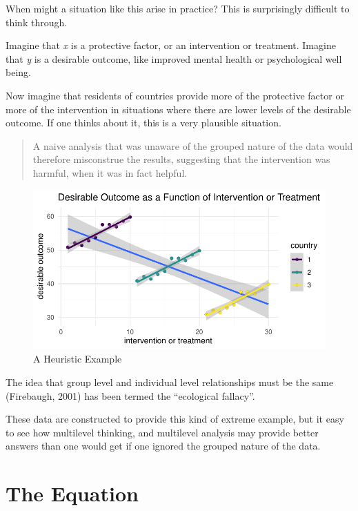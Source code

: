 \documentclass[
  letterpaper,
  DIV=11,
  numbers=noendperiod]{scrreprt}
\begin{document}
When might a situation like this arise in practice? This is surprisingly
difficult to think through.

Imagine that \emph{x} is a protective factor, or an intervention or
treatment. Imagine that \emph{y} is a desirable outcome, like improved
mental health or psychological well being.

Now imagine that residents of countries provide more of the protective
factor or more of the intervention in situations where there are lower
levels of the desirable outcome. If one thinks about it, this is a very
plausible situation.

\begin{quote}
A naive analysis that was unaware of the grouped nature of the data
would therefore misconstrue the results, suggesting that the
intervention was harmful, when it was in fact helpful.
\end{quote}

\begin{figure}

{\centering \includegraphics{./cross-sectional_files/figure-pdf/unnamed-chunk-9-1.pdf}

}

\caption{A Heuristic Example}

\end{figure}

The idea that group level and individual level relationships must be the
same (Firebaugh, 2001) has been termed the ``ecological fallacy''.

These data are constructed to provide this kind of extreme example, but
it easy to see how multilevel thinking, and multilevel analysis may
provide better answers than one would get if one ignored the grouped
nature of the data.

\hypertarget{the-equation}{%
\section{The Equation}\label{the-equation}}
\end{document}
